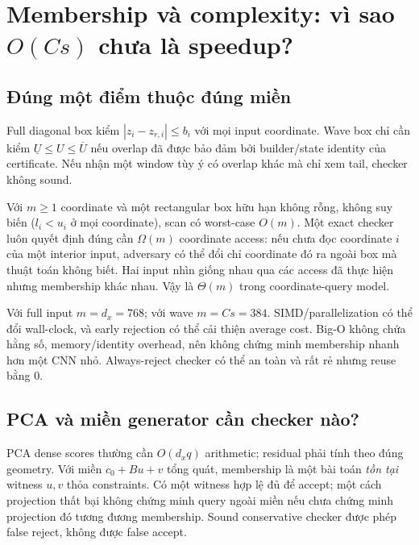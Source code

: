 \documentclass[11pt,a4paper]{article}
\theoremstyle{definition}
\begin{document}
\section{Membership và complexity: vì sao \texorpdfstring{$O(Cs)$}{O(Cs)} chưa là speedup?}
\subsection{Đúng một điểm thuộc đúng miền}
Full diagonal box kiểm $|z_i-z_{r,i}|\le b_i$ với mọi input coordinate.
Wave box chỉ cần kiểm $\underline U\le U\le\overline U$ nếu overlap đã
được bảo đảm bởi builder/state identity của certificate. Nếu nhận một
window tùy ý có overlap khác mà chỉ xem tail, checker không sound.

Với $m\ge1$ coordinate và một rectangular box hữu hạn không rỗng, không
suy biến ($l_i<u_i$ ở mọi coordinate), scan có worst-case $O(m)$.
Một exact checker luôn quyết định đúng cần $\Omega(m)$ coordinate access:
nếu chưa đọc coordinate $i$ của một interior input, adversary có thể đổi
chỉ coordinate đó ra ngoài box mà thuật toán không biết. Hai input nhìn
giống nhau qua các access đã thực hiện nhưng membership khác nhau.
Vậy là $\Theta(m)$ trong coordinate-query model.

Với full input $m=d_x=768$; với wave $m=Cs=384$. SIMD/parallelization có
thể đổi wall-clock, và early rejection có thể cải thiện average cost.
Big-O không chứa hằng số, memory/identity overhead, nên không chứng minh
membership nhanh hơn một CNN nhỏ. Always-reject checker có thể an toàn
và rất rẻ nhưng reuse bằng 0.

\subsection{PCA và miền generator cần checker nào?}
PCA dense scores thường cần $O(d_xq)$ arithmetic; residual phải tính theo
đúng geometry. Với miền $c_0+Bu+v$ tổng quát, membership là một bài toán
\emph{tồn tại} witness $u,v$ thỏa constraints. Có một witness hợp lệ đủ
để accept; một cách projection thất bại không chứng minh query ngoài miền
nếu chưa chứng minh projection đó tương đương membership. Sound conservative
checker được phép false reject, không được false accept.
\end{document}
